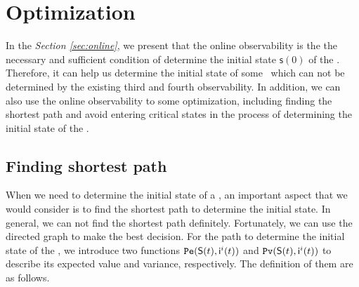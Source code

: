 \section{Optimization}
\label{sec:app}

In the {\em Section \ref{sec:online}}, we present that the online observability is the the necessary and sufficient condition of determine the initial state $\mathsf{s}(0)$ of the \BCNs. Therefore, it can help us determine the initial state of some \BCNs\ which can not be determined by the existing third and fourth observability. In addition, we can also use the online observability to some optimization, including finding the shortest path and avoid entering critical states in the process of determining the initial state of the \BCNs. %


\subsection{Finding shortest path}
When we need to determine the initial state of a \BCN, an important aspect that we would consider is to find the shortest path to determine the initial state. In general, we can not find the shortest path definitely. Fortunately, we can use the directed graph to make the best decision. For the path to determine the initial state of the \BCNs, we introduce two functions ${\tt Pe}(\mathsf{S}(t),\mathsf{ i}^{i}(t))$ and ${\tt Pv}(\mathsf{S}(t),\mathsf{ i}^{i}(t))$ to describe its expected value and variance, respectively. The definition of them are as follows.



